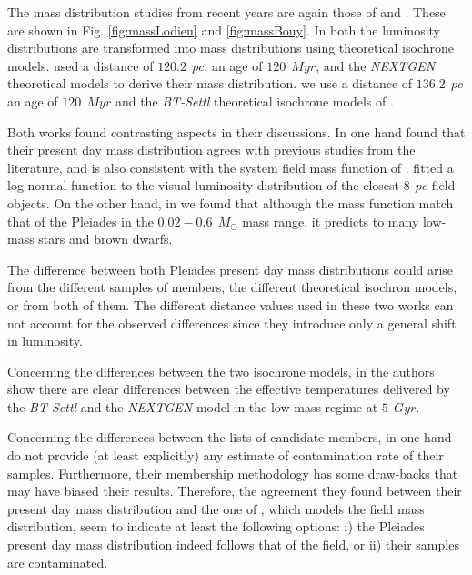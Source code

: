 The mass distribution studies from recent years are again those of \citet{Lodieu2012} and \citet{Bouy2015}. These are shown in Fig. \ref{fig:massLodieu} and \ref{fig:massBouy}. In both the luminosity distributions are transformed into mass distributions using theoretical isochrone models. \citet{Lodieu2012} used a distance of $120.2 \ \ pc$, an age of $120\ \ Myr$, and the \emph{NEXTGEN} theoretical models \citet{1998A&A...337..403B} to derive their mass distribution. \citet{Bouy2015} we use a distance of $136.2\ \ pc$ an age of $120\ \ Myr$ and the \emph{BT-Settl} theoretical isochrone models of \citet{2014IAUS..299..271A}. 


Both works found contrasting aspects in their discussions. In one hand \citet{Lodieu2012} found that their present day mass distribution agrees with previous studies from the literature, and is also consistent with the system field mass function of \citet{Chabrier2005}. \citet{Chabrier2005} fitted a log-normal function to the visual luminosity distribution of the closest $8 \ \ pc$ field objects. On the other hand, in \citet{Bouy2015} we found that although the \citet{Chabrier2005} mass function match that of the Pleiades in the $0.02-0.6\ \ M_{\odot}$ mass range, it predicts to many low-mass stars and brown dwarfs. 

The difference between both Pleiades present day mass distributions could arise from the different samples of members, the different theoretical isochron models, or from both of them. The different distance values used in these two works can not account for the observed differences since they introduce only a general shift in luminosity. 

Concerning the differences between the two isochrone models, in \citet{2013MmSAI..84.1053A} the authors show there are clear differences between the effective temperatures delivered by the \emph{BT-Settl} and the \emph{NEXTGEN} model in the low-mass regime at $5 \ \ Gyr$.  

Concerning the differences between the lists of candidate members, in one hand \citet{Lodieu2012} do not provide (at least explicitly) any estimate of contamination rate of their samples. Furthermore, their membership methodology has some draw-backs \cite[see][]{Sarro2014} that may have biased their results. Therefore, the agreement they found between their present day mass distribution and the one of \citet{Chabrier2005}, which models the field mass distribution, seem to indicate at least the following options: i) the Pleiades present day mass distribution indeed follows that of the field, or ii) their samples are contaminated.  

